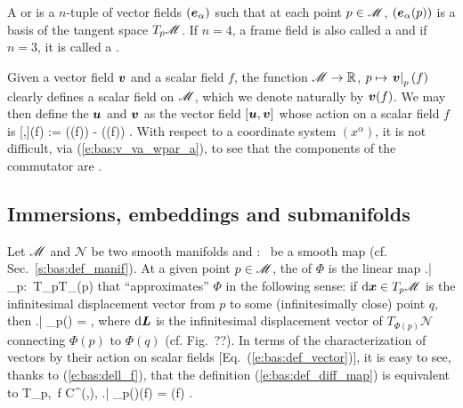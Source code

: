 A  or
 is a $n$-tuple of vector fields
$(\bm{e}_\alpha)$ such that at each point $p\in\mathscr{M}$, $(\bm{e}_\alpha(p))$ is
a basis of the tangent space $T_p\mathscr{M}$.
If $n=4$, a frame field is also called a  and if $n=3$,
it is called a
.

Given a vector field $\bm{v}$ and a scalar field $f$, the function
$\mathscr{M}\rightarrow \mathbb{R}$, $p\mapsto \left.\bm{v}\right|_p(f)$ clearly defines a scalar field on
$\mathscr{M}$, which we denote naturally by $\bm{v}(f)$.
We may then define the  $\bm{u}$
and $\bm{v}$ as the vector field $[\bm{u},\bm{v}]$ whose action on a scalar field $f$ is
\be \label{e:bas:def_commutator}
  [,](f) := ((f)) - ((f)) .
\ee
With respect to a coordinate system $(x^\alpha)$, it is not difficult, via
(\ref{e:bas:v_va_wpar_a}), to see that the components of the commutator are
\be \label{e:bas:commut_comp}
   .
\ee

\subsection{Immersions, embeddings and submanifolds} \label{s:bas:embed}

Let $\mathscr{M}$ and $\mathscr{N}$ be two smooth manifolds
and
\be
    \Phi:\ \M \longrightarrow {}
\ee
be a smooth map (cf. Sec.~\ref{s:bas:def_manif}).
At a given point $p\in\mathscr{M}$, the 
of $\Phi$ is the linear map
\be
    \left.\D\Phi \right| _p:\ T_p\M \longrightarrow T_{\Phi(p)}
\ee
that ``approximates'' $\Phi$ in the following sense: if $\mathrm{d}\bm{x}\in T_p\mathscr{M}$ is the
infinitesimal displacement vector from $p$ to some (infinitesimally close) point $q$,
then
\be \label{e:bas:def_diff_map}
    \left.\D\Phi \right| _p(\D{}) = \D{},
\ee
where $\mathrm{d}\bm{L}$ is the infinitesimal displacement vector of $T_{\Phi(p)}\mathscr{N}$
connecting $\Phi(p)$ to $\Phi(q)$ (cf. Fig.~??).
In terms of the characterization of vectors by their action on scalar fields
[Eq.~(\ref{e:bas:def_vector})], it is easy to see, thanks to (\ref{e:bas:dell_f}),
that the definition (\ref{e:bas:def_diff_map}) is equivalent to
\be
    \forall {}\in T_p\M,\ \forall f \in C^\infty(,),\quad
    \left.\D\Phi \right| _p()(f) =
        \left(f\circ \Phi \right) .
\ee

